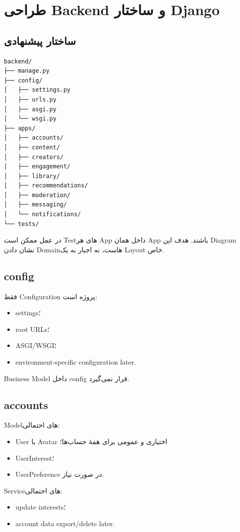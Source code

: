 
\chapter{طراحی Backend و ساختار Django}

\section{ساختار پیشنهادی}

\begin{latin}
\begin{lstlisting}
backend/
├── manage.py
├── config/
│   ├── settings.py
│   ├── urls.py
│   ├── asgi.py
│   └── wsgi.py
├── apps/
│   ├── accounts/
│   ├── content/
│   ├── creators/
│   ├── engagement/
│   ├── library/
│   ├── recommendations/
│   ├── moderation/
│   ├── messaging/
│   └── notifications/
└── tests/
\end{lstlisting}
\end{latin}

در عمل ممکن است Testهای هر App داخل همان App باشند. هدف این Diagram نشان دادن Domainهاست، نه اجبار به یک Layout خاص.

\section{config}

 فقط Configuration پروژه است:
\begin{itemize}
  \item settings؛
  \item root URLs؛
  \item ASGI/WSGI؛
  \item environment-specific configuration later.
\end{itemize}

Business Model داخل config قرار نمی‌گیرد.

\section{accounts}

Modelهای احتمالی:
\begin{itemize}
  \item User با Avatar اختیاری و عمومی برای همهٔ حساب‌ها؛
  \item UserInterest؛
  \item UserPreference در صورت نیاز.
\end{itemize}

Serviceهای احتمالی:
\begin{itemize}
  \item update interests؛
  \item account data export/delete later.
\end{itemize}

